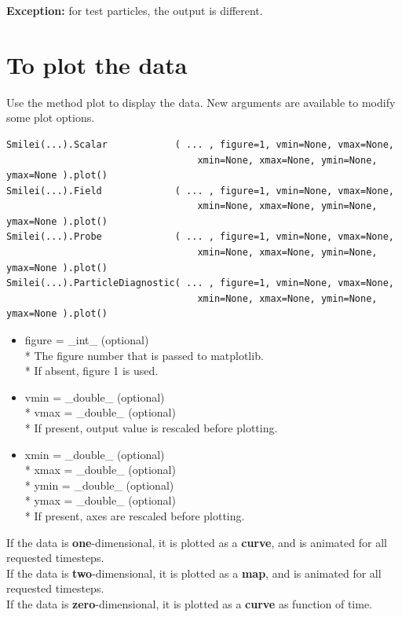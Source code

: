 \documentclass[11pt]{article}
\newcommand{\code}[1]{\colorbox{yellow!15}{\ttfamily #1}}
\begin{document}
\textbf{Exception:} for test particles, the output is different.


\section{To plot the data}
Use the method \code{plot} to display the data. New arguments are available to modify some plot options.
\begin{lstlisting}
Smilei(...).Scalar            ( ... , figure=1, vmin=None, vmax=None,
                                  xmin=None, xmax=None, ymin=None, ymax=None ).plot()
Smilei(...).Field             ( ... , figure=1, vmin=None, vmax=None,
                                  xmin=None, xmax=None, ymin=None, ymax=None ).plot()
Smilei(...).Probe             ( ... , figure=1, vmin=None, vmax=None,
                                  xmin=None, xmax=None, ymin=None, ymax=None ).plot()
Smilei(...).ParticleDiagnostic( ... , figure=1, vmin=None, vmax=None,
                                  xmin=None, xmax=None, ymin=None, ymax=None ).plot()
\end{lstlisting}

\begin{itemize}
\item \code{figure} = \code{\_int\_}       (optional)\\*
	The figure number that is passed to matplotlib.\\*
	If absent, figure 1 is used.

\item \code{vmin} = \code{\_double\_}    (optional)\\*
	\code{vmax} = \code{\_double\_}    (optional)\\*
	If present, output value is rescaled before plotting.

\item \code{xmin} = \code{\_double\_}    (optional)\\*
	\code{xmax} = \code{\_double\_}    (optional)\\*
	\code{ymin} = \code{\_double\_}    (optional)\\*
	\code{ymax} = \code{\_double\_}    (optional)\\*
	If present, axes are rescaled before plotting.
\end{itemize}

If the data is \textbf{one}-dimensional, it is plotted as a \textbf{curve}, and is animated for all requested timesteps.\\
If the data is \textbf{two}-dimensional, it is plotted as a \textbf{map}, and is animated for all requested timesteps.\\
If the data is \textbf{zero}-dimensional, it is plotted as a \textbf{curve} as function of time.\\
\end{document}
